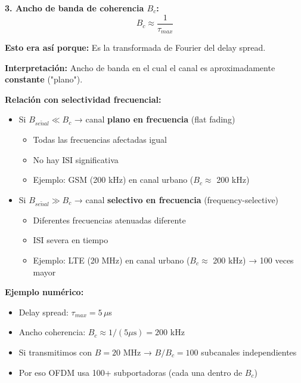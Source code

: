 \documentclass[10pt,a4paper]{article}
\begin{document}
\begin{tcolorbox}[colback=verdeclaro!10,colframe=verdeclaro,title=📊 Parámetros en Dominio FRECUENCIAL]
\textbf{3. Ancho de banda de coherencia $B_c$:}
$$\boxed{B_c \approx \frac{1}{\tau_{max}}}$$

\textbf{Esto era así porque:} Es la transformada de Fourier del delay spread.

\textbf{Interpretación:} Ancho de banda en el cual el canal es aproximadamente \textbf{constante} ("plano").

\textbf{Relación con selectividad frecuencial:}
\begin{itemize}
\item Si $B_{se\tilde{n}al} \ll B_c$ → canal \textbf{plano en frecuencia} (flat fading)
  \begin{itemize}
  \item Todas las frecuencias afectadas igual
  \item No hay ISI significativa
  \item Ejemplo: GSM (200 kHz) en canal urbano ($B_c \approx$ 200 kHz)
  \end{itemize}
\item Si $B_{se\tilde{n}al} \gg B_c$ → canal \textbf{selectivo en frecuencia} (frequency-selective)
  \begin{itemize}
  \item Diferentes frecuencias atenuadas diferente
  \item ISI severa en tiempo
  \item Ejemplo: LTE (20 MHz) en canal urbano ($B_c \approx$ 200 kHz) → 100 veces mayor
  \end{itemize}
\end{itemize}

\textbf{Ejemplo numérico:}
\begin{itemize}
\item Delay spread: $\tau_{max} = 5\,\mu$s
\item Ancho coherencia: $B_c \approx 1/(5\mu\text{s}) = 200$ kHz
\item Si transmitimos con $B = 20$ MHz → $B/B_c = 100$ subcanales independientes
\item Por eso OFDM usa 100+ subportadoras (cada una dentro de $B_c$)
\end{itemize}
\end{tcolorbox}
\end{document}
